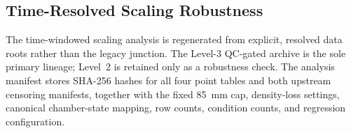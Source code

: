 \FloatBarrier

\subsection{Time-Resolved Scaling Robustness}
\label{app:time-scaling-robustness}

The time-windowed scaling analysis is regenerated from explicit, resolved data
roots rather than the legacy  junction. The
Level-3 QC-gated archive is the sole primary lineage; Level~2 is retained only
as a robustness check. The analysis manifest stores SHA-256 hashes for all four
point tables and both upstream censoring manifests, together with the fixed
\SI{85}{mm} cap, density-loss settings, canonical chamber-state mapping, row
counts, condition counts, and regression configuration.

